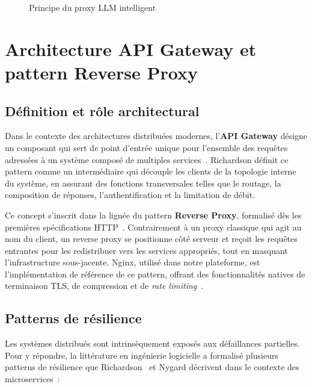 \begin{figure}[H]
    \centering
    \caption{Principe du proxy LLM intelligent}
    \label{fig:llm_proxy}
\end{figure}


\section{Architecture API Gateway et pattern Reverse Proxy}
\label{sec:apigateway}

\subsection{Définition et rôle architectural}

Dans le contexte des architectures distribuées modernes, l'\textbf{API Gateway} désigne un composant qui sert de point d'entrée unique pour l'ensemble des requêtes adressées à un système composé de multiples services~\cite{richardson2018}. Richardson définit ce pattern comme un intermédiaire qui découple les clients de la topologie interne du système, en assurant des fonctions transversales telles que le routage, la composition de réponses, l'authentification et la limitation de débit.

Ce concept s'inscrit dans la lignée du pattern \textbf{Reverse Proxy}, formalisé dès les premières spécifications HTTP~\cite{fielding2000}. Contrairement à un proxy classique qui agit au nom du client, un reverse proxy se positionne côté serveur et reçoit les requêtes entrantes pour les redistribuer vers les services appropriés, tout en masquant l'infrastructure sous-jacente. Nginx, utilisé dans notre plateforme, est l'implémentation de référence de ce pattern, offrant des fonctionnalités natives de terminaison TLS, de compression et de \textit{rate limiting}~\cite{nginx2024}.

\subsection{Patterns de résilience}

Les systèmes distribués sont intrinsèquement exposés aux défaillances partielles. Pour y répondre, la littérature en ingénierie logicielle a formalisé plusieurs patterns de résilience que Richardson~\cite{richardson2018} et Nygard décrivent dans le contexte des microservices~:

